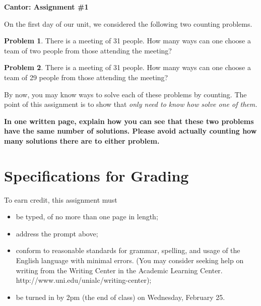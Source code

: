 \documentclass[12pt,letterpaper]{article}
\theoremstyle{definition}
\newtheorem{problem}{Problem}
\begin{document}
\setlength{\parskip}{1ex plus 0.5ex minus 0.2ex}
\setlength{\parindent}{0pt}

\pagestyle{fancy}
\lfoot{}
\rfoot{}

\begin{center}
{
\Large
\textbf{Cantor: Assignment \#1}
}
\end{center}

On the first day of our unit, we considered the following two counting problems.

\begin{problem}
There is a meeting of 31 people. How many ways can one choose a team of two people from those attending the meeting?
\end{problem}

\begin{problem}
There is a meeting of 31 people. How many ways can one choose a team of 29 people from those attending the meeting?
\end{problem}

By now, you may know ways to solve each of these problems by counting. 
The point of this assignment is to show that \emph{only need to know how solve one of them.}

\textbf{In one written page, explain how you can see that these two problems have the same number of solutions.  Please avoid actually counting how many solutions there are to either problem.}

\section*{Specifications for Grading}

To earn credit, this assignment must
\begin{itemize}
\item be typed, of no more than one page in length;
\item address the prompt above;
\item conform to reasonable standards for grammar, spelling, and usage of the English language with minimal errors. (You may consider seeking help on writing from the Writing Center in the Academic Learning Center. http://www.uni.edu/unialc/writing-center);
\item be turned in by 2pm (the end of class) on Wednesday, February 25.
\end{itemize}
\end{document}
